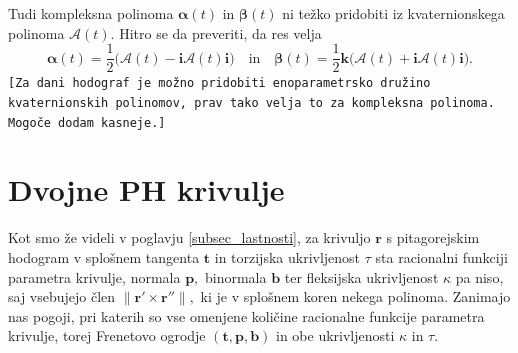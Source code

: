 \documentclass[12pt,a4paper,twoside]{article}
\theoremstyle{definition} %
\theoremstyle{plain} %
\theoremstyle{primerstyle}
\numberwithin{equation}{section}  %
\newcommand{\tV}{\mathbf{t}}
\newcommand{\bV}{\mathbf{b}}
\newcommand{\pV}{\mathbf{p}}
\newcommand{\rV}{\mathbf{r}}
\newcommand{\iV}{\mathbf{i}}
\newcommand{\kV}{\mathbf{k}}
\newcommand{\AQ}{\mathcal{A}}
\newcommand{\balpha}{\boldsymbol \alpha}
\newcommand{\bbeta}{\boldsymbol \beta}
\begin{document}
Tudi kompleksna polinoma $\balpha(t)$ in $\bbeta(t)$ ni težko pridobiti iz kvaternionskega polinoma $\AQ(t).$ Hitro se da preveriti, da res velja
\begin{equation}
	\label{quat_to_comp}
		\balpha(t) = \frac{1}{2}\big(\AQ(t)-\iV\AQ(t)\iV\big) \quad \text{in} \quad \bbeta(t)= \frac{1}{2}\kV\big(\AQ(t)+\iV\AQ(t)\iV\big).
\end{equation}
\texttt{[Za dani hodograf je možno pridobiti enoparametrsko družino kvaternionskih polinomov, prav tako velja to za kompleksna polinoma. Mogoče dodam kasneje.]}

\section{Dvojne PH krivulje}

Kot smo že videli v poglavju \ref{subsec_lastnosti}, za krivuljo $\rV$ s pitagorejskim hodogram v splošnem tangenta $\tV$ in torzijska ukrivljenost $\tau$ sta racionalni funkciji parametra krivulje, normala $\pV,$ binormala $\bV$ ter fleksijska ukrivljenost $\kappa$ pa niso, saj vsebujejo člen $\lVert \rV' \times \rV'' \rVert,$ ki je v splošnem koren nekega polinoma. Zanimajo nas pogoji, pri katerih so vse omenjene količine racionalne funkcije parametra krivulje, torej Frenetovo ogrodje $(\tV,\pV,\bV)$ in obe ukrivljenosti $\kappa$ in $\tau.$
\end{document}
